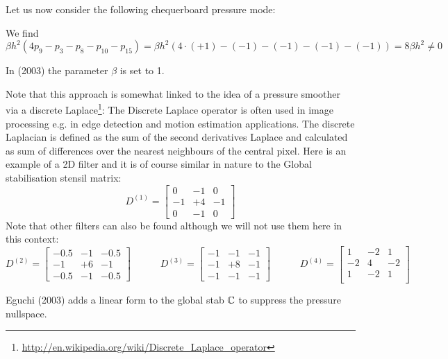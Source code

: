 Let us now consider the following chequerboard pressure mode:
\begin{center}

\end{center}
We find 
\[
\beta h^2 ( 4 p_9-p_3 -p_8-p_{10} -p_{15})  
=
\beta h^2 ( 4 \cdot (+1)-(-1) -(-1)-(-1) -(-1))  
= 8 \beta h^2 \ne 0
\]

\begin{remark}
In \textcite{cao03} (2003) the parameter $\beta$ is set to 1.
\end{remark}

\begin{remark}
Note that this approach is somewhat linked to the idea of a pressure smoother via a discrete  Laplace\footnote{\url{http://en.wikipedia.org/wiki/Discrete_Laplace_operator}}:
The Discrete Laplace operator is often used in image processing e.g. in edge detection and motion estimation applications. The discrete Laplacian is defined as the sum of the second derivatives Laplace
and calculated as sum of differences over the nearest neighbours of the central pixel. Here is an example of a 2D filter and it is of course similar in nature to the Global
stabilisation stensil matrix:
\[
D^{(1)}=
\left[
\begin{array}{ccc}
0 &-1 &0\\
-1 &+4 &-1\\
0 &-1 &0
\end{array}
\right]
\]
Note that other filters can also be found although we will not use them here in this context:
\[
D^{(2)}=
\left[
\begin{array}{ccc}
-0.5 &-1 &-0.5\\
-1 &+6 &-1\\
-0.5 &-1 &-0.5
\end{array}
\right]
\quad\quad\quad
D^{(3)}=
\left[
\begin{array}{ccc}
-1 &-1 &-1\\
-1 &+8 &-1\\
-1 &-1 &-1
\end{array}
\right]
\quad\quad\quad
D^{(4)}=
\left[
\begin{array}{ccc}
1 & -2 & 1 \\
-2 & 4 & -2 \\
1 & -2 & 1 \\
\end{array}
\right]
\]
\end{remark}    

Eguchi (2003) adds a linear form to the global stab ${\mathbb{C}}$ to suppress the pressure nullspace.

